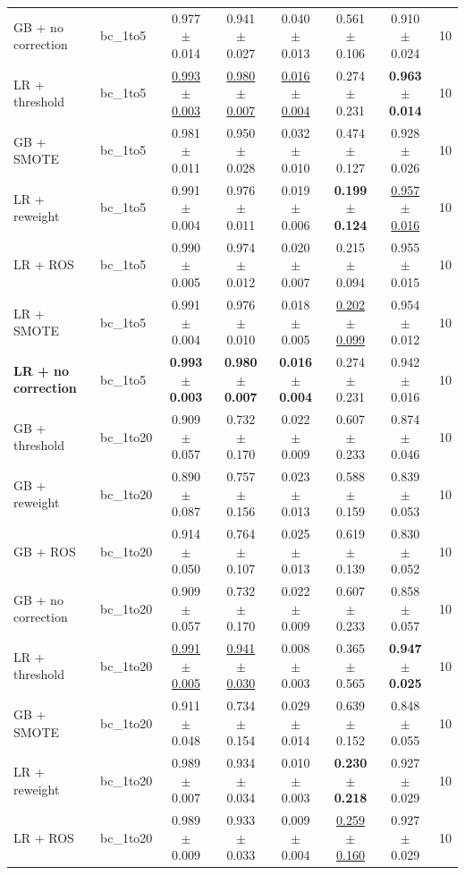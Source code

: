 \begin{tabular}{llcccccc}
GB + no correction & bc\_1to5 & 0.977 $\pm$ 0.014 & 0.941 $\pm$ 0.027 & 0.040 $\pm$ 0.013 & 0.561 $\pm$ 0.106 & 0.910 $\pm$ 0.024 & 10 \\
LR + threshold & bc\_1to5 & \underline{0.993 $\pm$ 0.003} & \underline{0.980 $\pm$ 0.007} & \underline{0.016 $\pm$ 0.004} & 0.274 $\pm$ 0.231 & \textbf{0.963 $\pm$ 0.014} & 10 \\
GB + SMOTE & bc\_1to5 & 0.981 $\pm$ 0.011 & 0.950 $\pm$ 0.028 & 0.032 $\pm$ 0.010 & 0.474 $\pm$ 0.127 & 0.928 $\pm$ 0.026 & 10 \\
LR + reweight & bc\_1to5 & 0.991 $\pm$ 0.004 & 0.976 $\pm$ 0.011 & 0.019 $\pm$ 0.006 & \textbf{0.199 $\pm$ 0.124} & \underline{0.957 $\pm$ 0.016} & 10 \\
LR + ROS & bc\_1to5 & 0.990 $\pm$ 0.005 & 0.974 $\pm$ 0.012 & 0.020 $\pm$ 0.007 & 0.215 $\pm$ 0.094 & 0.955 $\pm$ 0.015 & 10 \\
LR + SMOTE & bc\_1to5 & 0.991 $\pm$ 0.004 & 0.976 $\pm$ 0.010 & 0.018 $\pm$ 0.005 & \underline{0.202 $\pm$ 0.099} & 0.954 $\pm$ 0.012 & 10 \\
\textbf{LR + no correction} & bc\_1to5 & \textbf{0.993 $\pm$ 0.003} & \textbf{0.980 $\pm$ 0.007} & \textbf{0.016 $\pm$ 0.004} & 0.274 $\pm$ 0.231 & 0.942 $\pm$ 0.016 & 10 \\
\midrule
GB + threshold & bc\_1to20 & 0.909 $\pm$ 0.057 & 0.732 $\pm$ 0.170 & 0.022 $\pm$ 0.009 & 0.607 $\pm$ 0.233 & 0.874 $\pm$ 0.046 & 10 \\
GB + reweight & bc\_1to20 & 0.890 $\pm$ 0.087 & 0.757 $\pm$ 0.156 & 0.023 $\pm$ 0.013 & 0.588 $\pm$ 0.159 & 0.839 $\pm$ 0.053 & 10 \\
GB + ROS & bc\_1to20 & 0.914 $\pm$ 0.050 & 0.764 $\pm$ 0.107 & 0.025 $\pm$ 0.013 & 0.619 $\pm$ 0.139 & 0.830 $\pm$ 0.052 & 10 \\
GB + no correction & bc\_1to20 & 0.909 $\pm$ 0.057 & 0.732 $\pm$ 0.170 & 0.022 $\pm$ 0.009 & 0.607 $\pm$ 0.233 & 0.858 $\pm$ 0.057 & 10 \\
LR + threshold & bc\_1to20 & \underline{0.991 $\pm$ 0.005} & \underline{0.941 $\pm$ 0.030} & 0.008 $\pm$ 0.003 & 0.365 $\pm$ 0.565 & \textbf{0.947 $\pm$ 0.025} & 10 \\
GB + SMOTE & bc\_1to20 & 0.911 $\pm$ 0.048 & 0.734 $\pm$ 0.154 & 0.029 $\pm$ 0.014 & 0.639 $\pm$ 0.152 & 0.848 $\pm$ 0.055 & 10 \\
LR + reweight & bc\_1to20 & 0.989 $\pm$ 0.007 & 0.934 $\pm$ 0.034 & 0.010 $\pm$ 0.003 & \textbf{0.230 $\pm$ 0.218} & 0.927 $\pm$ 0.029 & 10 \\
LR + ROS & bc\_1to20 & 0.989 $\pm$ 0.009 & 0.933 $\pm$ 0.033 & 0.009 $\pm$ 0.004 & \underline{0.259 $\pm$ 0.160} & 0.927 $\pm$ 0.029 & 10 \\

\end{tabular}
